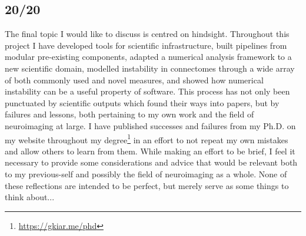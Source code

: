 \subsection{20/20}
The final topic I would like to discuss is centred on hindsight. Throughout this project I have developed tools
for scientific infrastructure, built pipelines from modular pre-existing components, adapted a numerical analysis
framework to a new scientific domain, modelled instability in connectomes through a wide array of both commonly
used and novel measures, and showed how numerical instability can be a useful property of software. This process
has not only been punctuated by scientific outputs which found their ways into papers, but by failures and lessons,
both pertaining to my own work and the field of neuroimaging at large. I have published successes and failures from
my Ph.D. on my website throughout my degree\footnote{\url{https://gkiar.me/phd}} in an effort to not repeat my own
mistakes and allow others to learn from them. While making an effort to be brief, I feel it necessary to provide
some considerations and advice that would be relevant both to my previous-self and possibly the field of
neuroimaging as a whole. None of these reflections are intended to be perfect, but merely serve as some things to
think about...

